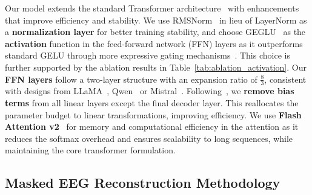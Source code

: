 \documentclass{article}
\newcommand{\bigbar}[1]{\overline{#1}}
\begin{document}


Our model extends the standard Transformer architecture~\citep{vaswani2017attention} with enhancements that improve efficiency and stability.
We use RMSNorm~\citep{zhang2019root} in lieu of LayerNorm as a \textbf{normalization layer} for better training stability, and choose GEGLU~\citep{shazeer2020glu} as the \textbf{activation} function in the feed-forward network (FFN) layers as it outperforms standard GELU through more expressive gating mechanisms~\citep{geiping2023cramming}. This choice is further supported by the ablation results in Table~\ref{tab:ablation_activation}.
Our \textbf{FFN layers} follow a two-layer structure with an expansion ratio of \( \frac{8}{3} \), consistent with designs from LLaMA~\citep{touvron2023llama1}, Qwen~\citep{bai2023qwen} or Mistral~\citep{jiang2023mistral}.
Following~\citet{Dayma_DALLE_Mini_2021}, we \textbf{remove bias terms} from all linear layers except the final decoder layer. This reallocates the parameter budget to linear transformations, improving efficiency. We use \textbf{Flash Attention v2}~\citep{ dao2023flashattention2} for memory and computational efficiency in the attention as it reduces the softmax overhead and ensures scalability to long sequences, while maintaining the core transformer formulation. 

\subsection{Masked EEG Reconstruction Methodology}

\end{document}
